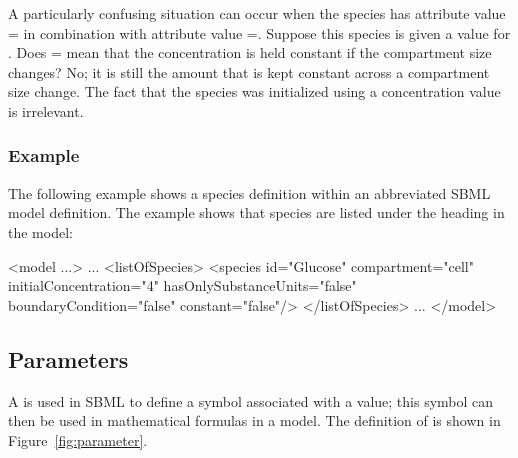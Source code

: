 A particularly confusing situation can occur when the species has
attribute value = in combination with
attribute value =.
Suppose this species is given a value for
.  Does =
mean that the concentration is held constant if the compartment
size changes?  No; it is still the amount that is kept constant
across a compartment size change.  The fact that the species was
initialized using a concentration value is irrelevant.


\subsubsection{Example}

The following example shows a species definition within an
abbreviated SBML model definition.  The example shows that species
are listed under the heading  in the model:

\begin{example}
<model ...>
    ...
    <listOfSpecies>
        <species id="Glucose" compartment="cell" initialConcentration="4"
                 hasOnlySubstanceUnits="false" boundaryCondition="false" constant="false"/>
    </listOfSpecies>
    ...
</model>
\end{example}


\subsection{Parameters}
\label{sec:parameters}

A \Parameter is used in SBML to define a symbol associated with a
value; this symbol can then be used in mathematical formulas in a
model. The definition of
\Parameter is shown in Figure~\vref{fig:parameter}.

